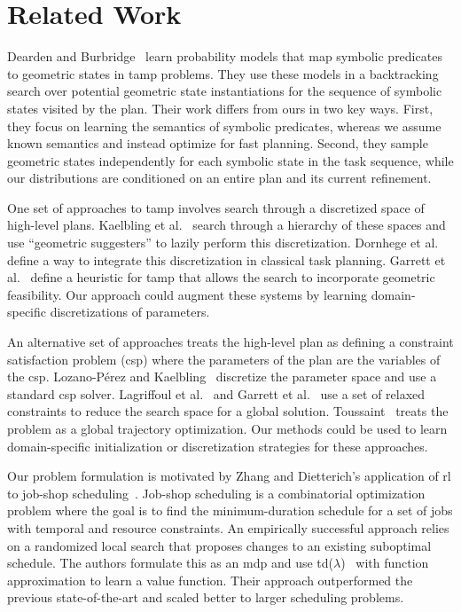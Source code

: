 \section{Related Work}
Dearden and Burbridge~\cite{deardenplanningtamp}
learn probability models that map symbolic predicates to
geometric states in {\sc tamp} problems. They use these models in a
backtracking search over potential geometric state instantiations for
the sequence of symbolic states visited by the plan.  Their work
differs from ours in two key ways. First, they focus on learning the
semantics of symbolic predicates, whereas we assume known semantics
and instead optimize for fast planning. Second, they sample geometric
states independently for each symbolic state in the task sequence,
while our distributions are conditioned on an entire plan and its
current refinement.

One set of approaches to {\sc tamp} involves search through a discretized space
of high-level plans. Kaelbling et al.~\cite{kaelbling2011hierarchical} search
through a hierarchy of these spaces and use ``geometric suggesters''
to lazily perform this discretization. Dornhege et
al.~\cite{dornhege2012semantic} define a way to integrate this
discretization in classical task planning. Garrett et
al.~\cite{GarrettWAFR14} define a heuristic for {\sc tamp} that allows
the search to incorporate geometric feasibility. Our approach could
augment these systems by learning domain-specific discretizations of
parameters.

An alternative set of approaches treats the high-level plan as defining a
constraint satisfaction problem ({\sc csp}) where the parameters of the plan
are the variables of the {\sc csp}. Lozano-P{\'e}rez and
Kaelbling~\cite{lozano2014constraint} discretize the parameter space
and use a standard {\sc csp} solver. Lagriffoul et
al.~\cite{lagriffoul2014orientation} and Garrett et
al.~\cite{garrett2015backward} use a set of relaxed constraints to
reduce the search space for a global
solution. Toussaint~\cite{toussaint2015logic} treats the problem as a
global trajectory optimization. Our methods could be used to learn
domain-specific initialization or discretization strategies for these
approaches.

Our problem formulation is motivated by Zhang and Dietterich's
application of {\sc rl} to job-shop
scheduling~\cite{JobShopSched}. Job-shop scheduling is a combinatorial
optimization problem where the goal is to find the minimum-duration
schedule for a set of jobs with temporal and resource constraints. An
empirically successful approach relies on a randomized
local search that proposes changes to an existing suboptimal
schedule. The authors formulate this as an {\sc mdp} and use {\sc
  td}($\lambda$)~\cite{suttonbarto} with function approximation to
learn a value function. Their approach outperformed the
previous state-of-the-art and scaled better to larger scheduling problems.

